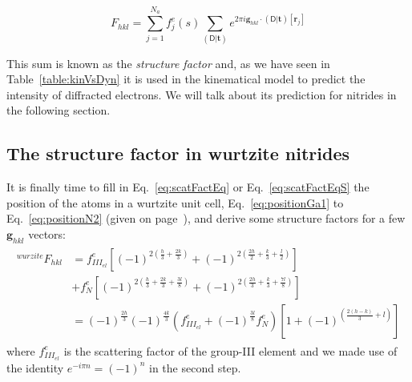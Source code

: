 \begin{equation}
\label{eq:scatFactEq}
F_{hkl} = \sum_{j=1}^{N_a} f^e_j(s) \sum_{(\mathsf{D}|\mathbf{t})} e^{2\pi i  \mathbf{g}_{hkl} \cdot (\mathsf{D}|\mathbf{t})[\mathbf{r}_j] }
\end{equation}



This sum is known as the \textit{structure factor} and, as we have seen in Table~\ref{table:kinVsDyn} it is used in the kinematical model to predict the intensity of diffracted electrons. We will talk about its prediction for nitrides in the following section.

%
\subsection{The structure factor in wurtzite nitrides}
{\label{sec:SF_GAN}}

It is finally time to fill in Eq.~\ref{eq:scatFactEq} or Eq.~\ref{eq:scatFactEqS} the position of the atoms in a wurtzite unit cell, Eq.~\ref{eq:positionGa1} to Eq.~\ref{eq:positionN2} (given on page~\pageref{eq:positionGa1}), and derive some structure factors for a few $\mathbf{g}_{hkl}$ vectors: 
\begin{align}
\begin{split}
\label{eq:scatFactWurzite}
^{wurzite}F_{hkl} &= f^e_{III_{el}}  \left[(-1)^{2(\frac{h}{3} + \frac{2k}{3})}  + (-1)^{2(\frac{2h}{2} + \frac{k}{3} +\frac{l}{2})} \right] \\
                & + f^e_{N}  \left[(-1)^{2(\frac{h}{3} + \frac{2k}{3} + \frac{3l}{8})}  + (-1)^{2(\frac{2h}{3} + \frac{k}{3} +\frac{7l}{8})} \right] \\
                &= (-1)^\frac{2h}{3} (-1)^\frac{4k}{3}  \left( f^e_{III_{el}} +   (-1)^\frac{3l}{8} f^e_{N} \right) \left[ 1  + (-1)^{ (\frac{2(h-k)}{3}  + l)}  \right]
\end{split}
\end{align}
where $f^e_{III_{el}}$ is the scattering factor of the group-III element and we made use of the identity  $e^{-i \pi n}=(-1)^n$ in the second step.



